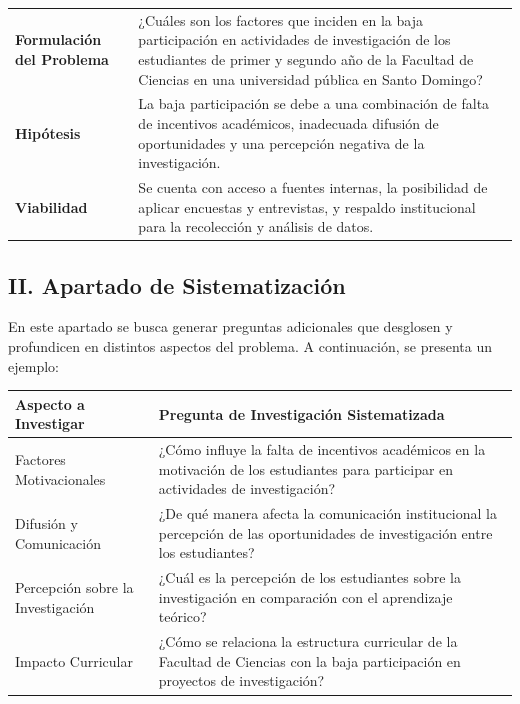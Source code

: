 \documentclass[12pt,a4paper]{article}
\begin{document}
\begin{tabular}{@{}p{5cm}p{10cm}@{}}
\textbf{Formulación del Problema} & ¿Cuáles son los factores que inciden en la baja participación en actividades de investigación de los estudiantes de primer y segundo año de la Facultad de Ciencias en una universidad pública en Santo Domingo? \\[1mm]
\textbf{Hipótesis} & La baja participación se debe a una combinación de falta de incentivos académicos, inadecuada difusión de oportunidades y una percepción negativa de la investigación. \\[1mm]
\textbf{Viabilidad} & Se cuenta con acceso a fuentes internas, la posibilidad de aplicar encuestas y entrevistas, y respaldo institucional para la recolección y análisis de datos. \\ \bottomrule
\end{tabular}

\subsection*{II. Apartado de Sistematización}

En este apartado se busca generar preguntas adicionales que desglosen y profundicen en distintos aspectos del problema. A continuación, se presenta un ejemplo:

\bigskip

\begin{tabular}{@{}p{5cm}p{10cm}@{}}
\toprule
\textbf{Aspecto a Investigar} & \textbf{Pregunta de Investigación Sistematizada} \\ \midrule
Factores Motivacionales & ¿Cómo influye la falta de incentivos académicos en la motivación de los estudiantes para participar en actividades de investigación? \\[2mm]
Difusión y Comunicación & ¿De qué manera afecta la comunicación institucional la percepción de las oportunidades de investigación entre los estudiantes? \\[2mm]
Percepción sobre la Investigación & ¿Cuál es la percepción de los estudiantes sobre la investigación en comparación con el aprendizaje teórico? \\[2mm]
Impacto Curricular & ¿Cómo se relaciona la estructura curricular de la Facultad de Ciencias con la baja participación en proyectos de investigación? \\ \bottomrule
\end{tabular}
\end{document}
